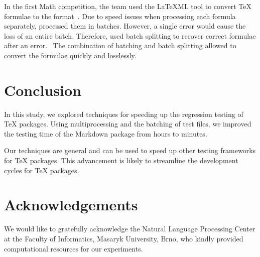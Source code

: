 \documentclass[final]{ltugboat}
\begin{document}
In the first Math competition, the  team used the \LaTeX ML tool to convert \TeX{} formulae to the  format~\cite[Section~2.2]{novotny2020three}. Due to speed issues when processing each formula separately,  processed them in batches. However, a single error would cause the loss of an entire batch. Therefore,  used batch splitting to recover correct formulae after an error.~\cite{novotny2020arqmath} The combination of batching and batch splitting allowed  to convert the formulae quickly and losslessly.

\section{Conclusion}
\label{sec:conclusion}

In this study, we explored techniques for speeding up the regression testing of \TeX{} packages. Using multiprocessing and the batching of test files, we improved the testing time of the Markdown package from hours to minutes.

Our techniques are general and can be used to speed up other testing frameworks for \TeX{} packages. This advancement is likely to streamline the development cycles for \TeX{} packages.

\medskip
\noindent


\section*{Acknowledgements}
We would like to gratefully acknowledge the Natural Language Processing Center at the Faculty of Informatics, Masaryk University, Brno, who kindly provided computational resources for our experiments.


\begingroup
\gappto{\UrlBreaks}{\UrlOrds}
\RaggedRight

\endgroup

\makesignature
\end{document}
